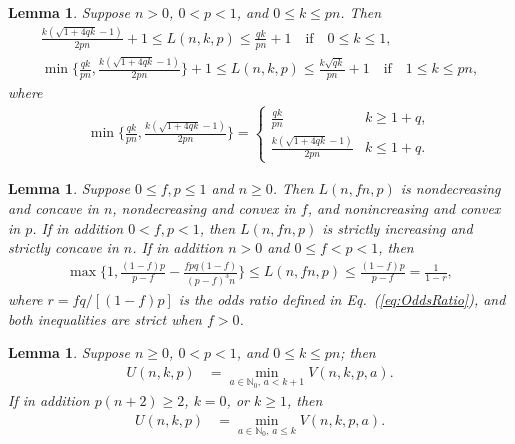 \documentclass[aop]{imsart}
\theoremstyle{plain}
\newtheorem{lemma}[theorem]{Lemma}
\theoremstyle{remark}
\newcommand{\bbN}{\mathbb{N}}
\newcommand{\1}{\operatorname{\uppercase\expandafter{\romannumeral1}}}
\newcommand{\2}{\operatorname{\uppercase\expandafter{\romannumeral2}}}
\newcommand{\3}{\operatorname{\uppercase\expandafter{\romannumeral3}}}
\newcommand{\4}{\operatorname{\uppercase\expandafter{\romannumeral4}}}
\newcommand{\5}{\operatorname{\uppercase\expandafter{\romannumeral5}}}
\newcommand{\6}{\operatorname{\uppercase\expandafter{\romannumeral6}}}
\newcommand{\7}{\operatorname{\uppercase\expandafter{\romannumeral7}}}
\newcommand{\8}{\operatorname{\uppercase\expandafter{\romannumeral8}}}
\newcommand{\9}{\operatorname{\uppercase\expandafter{\romannumeral9}}}
\newcommand{\eref}[1]{Eq.~\textup{(\ref{#1})}}
\begin{document}
\begin{lemma}\label{lem:LnkpLUB2}
	Suppose $n>0$, $0< p< 1$,  and $0\leq k\leq p n$. Then
	\begin{gather}
	\frac{k(\sqrt{1+4q k}-1)}{2p n}+1\leq L(n,k,p)\leq 
	\frac{q k}{p n}+1 \quad \mbox{if}\quad  0\leq k\leq 1, \label{eq:LnkpUBkleq1}\\[1ex]
	{\min}\biggl\{\frac{q k}{p n},\frac{k(\sqrt{1+4q k}-1)}{2p n} \biggr\}
	+1\leq L(n,k,p)\leq 
	\frac{k\sqrt{q k}}{p n}+1 \quad \mbox{if}\quad  1\leq  k\leq p n, \label{eq:LnkpUBkg1}
	\end{gather}
	where  
	\begin{align}
	{\min}\biggl\{\frac{q k}{p n},\frac{k(\sqrt{1+4q k}-1)}{2p n } \biggr\}
	=\begin{cases}
	\frac{q k}{p n } &k \geq 1+q, \\[1ex]
	\frac{k(\sqrt{1+4q k}-1)}{2p n } &k \leq 1+q. 
	\end{cases}
	\end{align}
\end{lemma}





\begin{lemma}\label{lem:Lnfpmono}
	Suppose $0\leq f,p\leq 1$ and $n\geq 0$.  Then $L(n,f n,p)$  is nondecreasing and concave in $n$, nondecreasing and convex in $f$,  and   nonincreasing and convex in $p$. If in addition $0<f,p<1$, then $L(n,f n,p)$ is strictly increasing and strictly concave in $n$. 
	If in addition $n>0$ and  $0\leq f<p<1$, then
	\begin{gather}
	\max\biggl\{1,\frac{(1-f)p}{p-f}-\frac{fpq(1-f) }{(p-f)^3n} \biggr\}\leq L(n,f n,p)\leq \frac{(1-f)p}{p-f}=\frac{1}{1-r}, 
	\label{eq:LnfpLBUB}
	\end{gather}	
where $r=fq/[(1-f)p]$ is the odds ratio defined in \eref{eq:OddsRatio}, and both inequalities are strict when $f>0$. 	
\end{lemma}

\begin{lemma}\label{lem:U1nkpAlt}
	Suppose $n\geq 0$, $0<p<1$, and $0\leq k\leq p n$; then 
	\begin{align}
	U(n,k,p)&=\min_{a\in \bbN_0,\, a< k+1} V(n,k,p,a). \label{eq:U1nkpAlt}
	\end{align} 
	If in addition $p(n+2)\geq 2$, $k=0$, or $k\geq 1$, then 
	\begin{align}
	U(n,k,p)&=\min_{a\in \bbN_0,\, a\leq k} V(n,k,p,a).\label{eq:U1nkpAlt3}
	\end{align}
\end{lemma}
\end{document}
